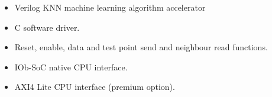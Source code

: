 \begin{itemize}
\item Verilog KNN machine learning algorithm accelerator
\item C software driver.
\item Reset, enable, data and test point send and neighbour read functions.
\item IOb-SoC native CPU interface.
\item AXI4 Lite CPU interface (premium option).
\end{itemize}
